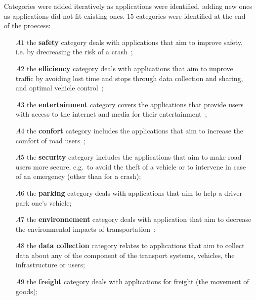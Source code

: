 Categories were added iteratively as applications were identified, adding new ones as applications did not fit existing ones. 15 categories were identified at the end of the proecess: 

\begin{enumerate}
\item[$A1$] the \textbf{safety} category deals with applications that aim to improve safety, i.e. by drecreasing the risk of a crash~\cite{hamida_security_2015};
\item[$A2$] the \textbf{efficiency} category deals with applications that aim to improve traffic by avoiding lost time and stops through data collection and sharing, and optimal vehicle control~\cite{hamida_security_2015};
\item[$A3$] the \textbf{entertainment} category covers the applications that provide users with access to the internet and media for their entertainment~\cite{hamida_security_2015};
\item[$A4$] the \textbf{confort} category includes the applications that aim to increase the comfort of road users~\cite{hamida_security_2015};
\item[$A5$] the \textbf{security} category includes the applications that aim to make road users more secure, e.g.\ to avoid the theft of a vehicle or to intervene in case of an emergency (other than for a crash); 
\item[$A6$] the \textbf{parking} category deals with applications that aim to help a driver park one's vehicle; 
\item[$A7$] the \textbf{environnement} category deals with application that aim to decrease the environmental impacts of transportation~\cite{chang_estimated_2015};
\item[$A8$] the \textbf{data collection} category relates to applications that aim to collect data about any of the component of the transport systems, vehicles, the infrastructure or users;   
\item[$A9$] the \textbf{freight} category deals with applications for freight (the movement of goods);

\end{enumerate}
